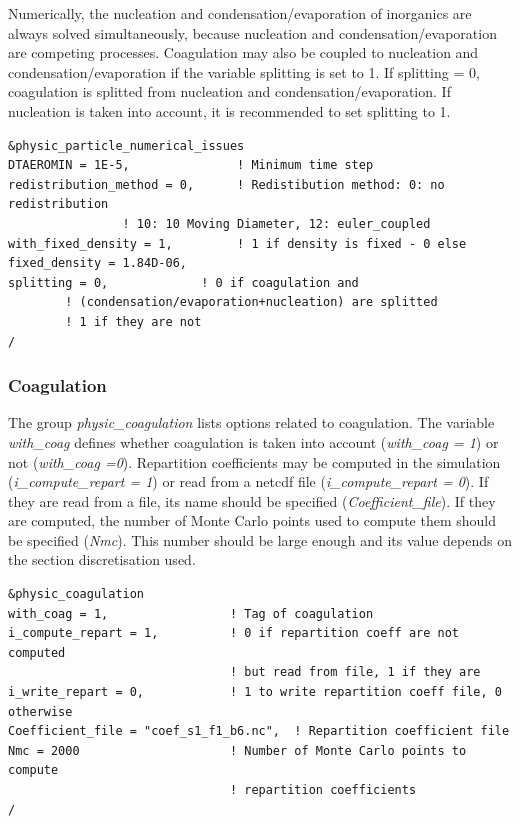\documentclass[a4paper,11pt]{article}
\begin{document}
Numerically, the nucleation and condensation/evaporation of inorganics are always solved simultaneously, because nucleation and condensation/evaporation are competing processes. Coagulation may also be coupled to nucleation and condensation/evaporation if the variable splitting is set to 1. If splitting = 0, coagulation is splitted from nucleation and condensation/evaporation. If nucleation is taken into account, it is recommended to set splitting to 1.

\begin{verbatim}
&physic_particle_numerical_issues
DTAEROMIN = 1E-5,              	! Minimum time step
redistribution_method = 0,   	! Redistibution method: 0: no redistribution
				! 10: 10 Moving Diameter, 12: euler_coupled
with_fixed_density = 1,       	! 1 if density is fixed - 0 else
fixed_density = 1.84D-06,        
splitting = 0,             ! 0 if coagulation and 
		! (condensation/evaporation+nucleation) are splitted 
		! 1 if they are not
/
\end{verbatim}

\subsubsection{Coagulation}

The group {\textit{physic\_coagulation}} lists options related to coagulation. The variable {\textit{with\_coag}} defines whether coagulation is taken into account ({\textit{with\_coag = 1}}) or not ({\textit{with\_coag =0}}). 
Repartition coefficients may be computed in the simulation ({\textit{i\_compute\_repart = 1}}) or read from a netcdf file ({\textit{i\_compute\_repart = 0}}). If they are read from a file, its name should be specified ({\textit{Coefficient\_file}}). If they are computed, the number of Monte Carlo points used to compute them should be specified ({\textit{Nmc}}). This number should be large enough and its value depends on the section discretisation used.


\begin{verbatim}
&physic_coagulation
with_coag = 1,                 ! Tag of coagulation
i_compute_repart = 1,          ! 0 if repartition coeff are not computed 
                               ! but read from file, 1 if they are 
i_write_repart = 0,            ! 1 to write repartition coeff file, 0 otherwise
Coefficient_file = "coef_s1_f1_b6.nc",  ! Repartition coefficient file
Nmc = 2000                     ! Number of Monte Carlo points to compute
                               ! repartition coefficients
/
\end{verbatim}
          
\end{document}
